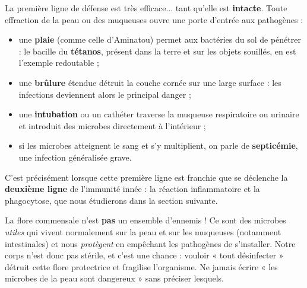 \documentclass[11pt]{article}
\newcommand{\cle}[1]{{\popxbold\color{popdark}#1}}
\begin{document}
La première ligne de défense est très efficace... tant qu'elle est \textbf{intacte}. Toute effraction de la peau ou des muqueuses ouvre une \cle{porte d'entrée} aux pathogènes :
\begin{itemize}
\item une \textbf{plaie} (comme celle d'Aminatou) permet aux bactéries du sol de pénétrer : le bacille du \textbf{tétanos}, présent dans la terre et sur les objets souillés, en est l'exemple redoutable ;
\item une \textbf{brûlure} étendue détruit la couche cornée sur une large surface : les infections deviennent alors le principal danger ;
\item une \textbf{intubation} ou un cathéter traverse la muqueuse respiratoire ou urinaire et introduit des microbes directement à l'intérieur ;
\item si les microbes atteignent le sang et s'y multiplient, on parle de \textbf{septicémie}, une infection généralisée grave.
\end{itemize}
C'est précisément lorsque cette première ligne est franchie que se déclenche la \textbf{deuxième ligne} de l'immunité innée : la réaction inflammatoire et la phagocytose, que nous étudierons dans la section suivante.

\begin{attention}
La flore commensale n'est \textbf{pas} un ensemble d'ennemis ! Ce sont des microbes \emph{utiles} qui vivent normalement sur la peau et sur les muqueuses (notamment intestinales) et nous \emph{protègent} en empêchant les pathogènes de s'installer. Notre corps n'est donc pas stérile, et c'est une chance : vouloir « tout désinfecter » détruit cette flore protectrice et fragilise l'organisme. Ne jamais écrire « les microbes de la peau sont dangereux » sans préciser lesquels.
\end{attention}
\end{document}
